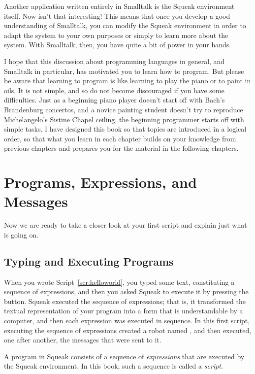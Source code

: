 \documentclass[a4paper,10pt,twoside]{book}
\begin{document}
Another application written entirely in Smalltalk is the Squeak environment itself. Now 
isn’t that interesting! This means that once you develop a good understanding of Smalltalk, 
you can modify the Squeak environment in order to adapt the system to your own purposes or 
simply to learn more about the system. With Smalltalk, then, you have quite a bit of power in 
your hands. 

I hope that this discussion about programming languages in general, and Smalltalk in 
particular, has motivated you to learn how to program. But please be aware that learning to 
program is like learning to play the piano or to paint in oils. It is not simple, and so do not 
become discouraged if you have some difficulties. Just as a beginning piano player doesn’t 
start off with Bach's Brandenburg concertos, and a novice painting student doesn’t try to reproduce Michelangelo’s Sistine Chapel ceiling, the beginning programmer starts off with simple tasks. I have designed this book so that topics are introduced in a logical order, so that what you learn in each chapter builds on your knowledge from previous chapters and prepares you for the material in the following chapters. 



\section{Programs, Expressions, and Messages}

Now we are ready to take a closer look at your first script and explain just what is going on. 

\subsection{Typing and Executing Programs}

When you wrote Script~\ref{scr:helloworld}, you typed some text, constituting a sequence of expressions, and then you asked Squeak to execute it by pressing the  button. Squeak executed the sequence of expressions; that is, it transformed the textual representation of your program 
into a form that is understandable by a computer, and then each expression was executed in 
sequence. In this first script, executing the sequence of expressions created a robot named 
, and then  executed, one after another, the messages that were sent to it. 

A program in Squeak consists of a sequence of \emph{expressions} that are executed by the 
Squeak environment. In this book, such a sequence is called a \emph{script}. 
\end{document}
